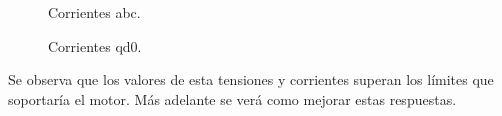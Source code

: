 \documentclass[a4paper, 10pt, onecolumn,journal]{ieeeconf}
\begin{document}
\begin{figure}[H]
	\centering
	\begin{adjustbox}{max width=\columnwidth}
	\end{adjustbox}
	\caption{Corrientes abc.}
	\label{Corrientes abc}
\end{figure}

\begin{figure}[H]
	\centering
	\begin{adjustbox}{max width=\columnwidth}
	\end{adjustbox}
	\caption{Corrientes qd0.}
	\label{Corrientes qd0}
\end{figure}
Se observa que los valores de esta tensiones y corrientes superan los límites que soportaría el motor. Más adelante se verá como mejorar estas respuestas.
\end{document}
